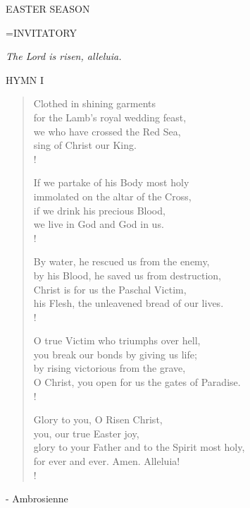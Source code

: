 \begin{center}\normalsize EASTER SEASON\\
\end{center}

\hangindent=\parindent \small{INVITATORY}
\begin{center}
\textit{The Lord is risen, alleluia.\\}
\end{center}

\noindent\small{\uppercase{Hymn I}}\normalsize\label{easter:firstHymn}
\begin{verse}
Clothed in shining garments\\
for the Lamb's royal wedding feast,\\
we who have crossed the Red Sea,\\
sing of Christ our King.\\!

If we partake of his Body most holy\\
immolated on the altar of the Cross,\\
if we drink his precious Blood,\\
we live in God and God in us.\\!

By water, he rescued us from the enemy,\\
by his Blood, he saved us from destruction,\\
Christ is for us the Paschal Victim,\\
his Flesh, the unleavened bread of our lives.\\!

O true Victim who triumphs over hell,\\
you break our bonds by giving us life;\\
by rising victorious from the grave,\\
O Christ, you open for us the gates of Paradise.\\!

Glory to you, O Risen Christ,\\
you, our true Easter joy,\\
glory to your Father and to the Spirit most holy,\\
for ever and ever. Amen. Alleluia!\\!
\end{verse}
\begin{flushright}\tiny - Ambrosienne\end{flushright}


